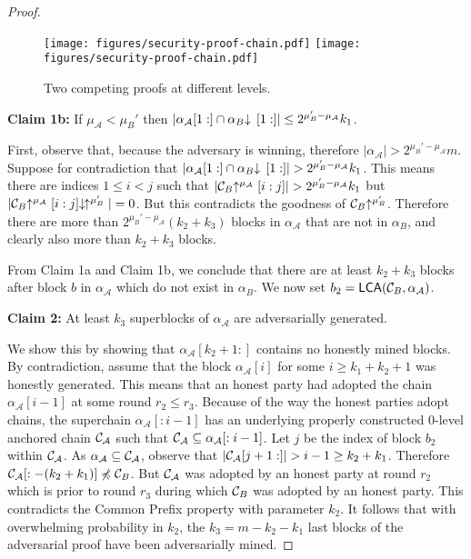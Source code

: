 \begin{proof}
    \begin{figure}
        \caption{Two competing proofs at different levels.}
        \centering
        \iftwocolumn
          \texttt{[image: figures/security-proof-chain.pdf]}
        \else
          \texttt{[image: figures/security-proof-chain.pdf]}
        \fi
        \label{fig.sec-comparison}
    \end{figure}

    \textbf{Claim 1b: } If $\mu_\mathcal{A} < \mu_B'$ then
    $|\alpha_\mathcal{A}[1:] \cap \alpha_B\negthickspace\downarrow\,[1:]| \leq 2^{\mu_B' - \mu_\mathcal{A}} k_1$.

    First, observe that, because the adversary is winning, therefore
    $|\alpha_\mathcal{A}| > 2^{\mu_B' - \mu_\mathcal{A}}m$.
    Suppose for contradiction that $|\alpha_\mathcal{A}[1:] \cap
    \alpha_B\negthickspace\downarrow\,[1:]| > 2^{\mu_B' - \mu_\mathcal{A}} k_1$. This means
    there are indices $1 \leq i < j$ such that
    $|\mathcal{C}_B\negthickspace\uparrow^{\mu_\mathcal{A}}[i:j]| > 2^{\mu_B' - \mu_\mathcal{A}}
    k_1$ but
    $|\mathcal{C}_B\negthickspace\uparrow^{\mu_\mathcal{A}}[i:j]\negthickspace\downarrow\,\negthickspace\uparrow^{\mu_B'}| = 0$.
    But this contradicts the goodness of $\mathcal{C}_B\negthickspace\uparrow^{\mu_B'}$. Therefore
    there are more than $2^{\mu_B' - \mu_\mathcal{A}}(k_2 + k_3)$ blocks in
    $\alpha_\mathcal{A}$ that are not in $\alpha_B$, and clearly also more than $k_2 + k_3$ blocks.

    From Claim 1a and Claim 1b, we conclude that there are at least $k_2 + k_3$
    blocks after block $b$ in $\alpha_\mathcal{A}$ which do not exist in
    $\alpha_B$. We now set $b_2 = \textsf{LCA}(\mathcal{C}_B, \alpha_\mathcal{A})$.

    \textbf{Claim 2: } At least $k_3$ superblocks of $\alpha_\mathcal{A}$ are
    adversarially generated.

    We show this by showing that $\alpha_\mathcal{A}[k_2 + 1:]$ contains
    no honestly mined blocks. By contradiction, assume that the block
    $\alpha_\mathcal{A}[i]$ for some $i \geq k_1 + k_2 + 1$ was honestly generated.
    This means that an honest party had adopted the chain
    $\alpha_\mathcal{A}[i - 1]$ at some round $r_2 \leq r_3$. Because of the
    way the honest parties adopt chains, the superchain
    $\alpha_\mathcal{A}[:i - 1]$ has an underlying properly constructed
    $0$-level anchored chain $\mathcal{C}_\mathcal{A}$ such that
    $\mathcal{C}_\mathcal{A} \subseteq \alpha_\mathcal{A}[:i - 1]$. Let $j$ be
    the index of block $b_2$ within $\mathcal{C}_\mathcal{A}$.  As
    $\alpha_\mathcal{A} \subseteq \mathcal{C}_\mathcal{A}$, observe that
    $|\mathcal{C}_\mathcal{A}[j + 1:]| > i -
    1 \geq k_2 + k_1$. Therefore $\mathcal{C}_\mathcal{A}[:-(k_2 + k_1)] \not\preccurlyeq
    \mathcal{C}_B$. But $\mathcal{C}_\mathcal{A}$ was adopted by an honest party at
    round $r_2$ which is prior to round $r_3$ during which $\mathcal{C}_B$ was
    adopted by an honest party. This contradicts the Common Prefix
    \cite{backbone} property with parameter $k_2$.
    It follows that with overwhelming probability in $k_2$, the $k_3 = m - k_2 -
    k_1$ last blocks of the adversarial proof have been adversarially mined.


\end{proof}
